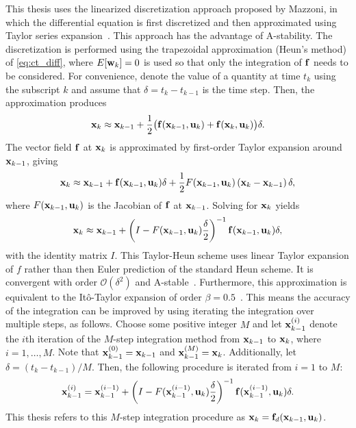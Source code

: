 \documentclass[../zhang_thesis.tex]{subfiles}
\begin{document}
This thesis uses the linearized discretization approach proposed by Mazzoni, in which the differential equation is first discretized and then approximated using Taylor series expansion~\cite{mazzoni07}. This approach has the advantage of A-stability. The discretization is performed using the trapezoidal approximation (Heun's method) of \cref{eq:ct_diff}, where $E[\mathbf{w}_k]=0$ is used so that only the integration of $\mathbf{f}$ needs to be considered. For convenience, denote the value of a
quantity at time $t_k$ using the subscript $k$ and assume that $\delta=t_k-t_{k-1}$ is the time step. Then, the approximation produces
\begin{equation}
    \mathbf{x}_k \approx \mathbf{x}_{k-1} + \frac{1}{2} \big( \mathbf{f}(\mathbf{x}_{k-1},\mathbf{u}_k) + \mathbf{f}(\mathbf{x}_k,\mathbf{u}_k) \big) \delta.
\end{equation}
The vector field $\mathbf{f}$ at $\mathbf{x}_k$ is approximated by first-order Taylor expansion around $\mathbf{x}_{k-1}$, giving
\begin{equation}
    \mathbf{x}_k \approx \mathbf{x}_{k-1} + \mathbf{f}(\mathbf{x}_{k-1},\mathbf{u}_k)\delta + \frac{1}{2} F(\mathbf{x}_{k-1},\mathbf{u}_k) \left( \mathbf{x}_k - \mathbf{x}_{k-1} \right) \delta,
\end{equation}
where $F(\mathbf{x}_{k-1},\mathbf{u}_k)$ is the Jacobian of $\mathbf{f}$ at $\mathbf{x}_{k-1}$. Solving for $\mathbf{x}_k$ yields
\begin{equation}
    \mathbf{x}_k \approx \mathbf{x}_{k-1} + \left( I - F(\mathbf{x}_{k-1},\mathbf{u}_k) \frac{\delta}{2} \right)^{-1} \mathbf{f}(\mathbf{x}_{k-1},\mathbf{u}_k) \delta,
\end{equation}
with the identity matrix $I$. This Taylor-Heun scheme uses linear Taylor expansion of $f$ rather than then Euler prediction of the standard Heun scheme. It is convergent with order $\mathcal{O}(\delta^2)$ and A-stable~\cite{mazzoni07}. Furthermore, this approximation is equivalent to the It\^o-Taylor expansion of order $\beta=0.5$~\cite{kloeden99}. This means the accuracy of the integration can be improved by using iterating the integration over multiple steps, as follows. Choose some
positive integer $M$ and let $\mathbf{x}^{(i)}_{k-1}$ denote the $i$th iteration of the $M$-step integration method from $\mathbf{x}_{k-1}$ to $\mathbf{x}_k$, where $i=1,\dots,M$. Note that $\mathbf{x}^{(0)}_{k-1}=\mathbf{x}_{k-1}$ and $\mathbf{x}^{(M)}_{k-1}=\mathbf{x}_k$. Additionally, let $\delta=(t_k-t_{k-1})/M$. Then, the following procedure is iterated from $i=1$ to $M$:
\begin{equation}
    \mathbf{x}^{(i)}_{k-1} = \mathbf{x}^{(i-1)}_{k-1} + \left( I - F(\mathbf{x}^{(i-1)}_{k-1},\mathbf{u}_k) \frac{\delta}{2} \right)^{-1} \mathbf{f}(\mathbf{x}^{(i-1)}_{k-1},\mathbf{u}_k) \delta.
\end{equation}
This thesis refers to this $M$-step integration procedure as $\mathbf{x}_k=\mathbf{f}_d(\mathbf{x}_{k-1},\mathbf{u}_k)$.
\end{document}
